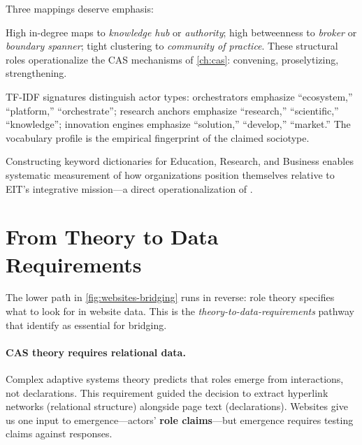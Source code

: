 \documentclass[../main.tex]{subfiles}
\begin{document}
Three mappings deserve emphasis:

\begin{description}[leftmargin=0.5cm, itemsep=0.3em]
\item[Network position $\rightarrow$ Structural role.]
High in-degree maps to \emph{knowledge hub} or \emph{authority};
high betweenness to \emph{broker} or \emph{boundary spanner};
tight clustering to \emph{community of practice}.
These structural roles operationalize the CAS mechanisms
of \cref{ch:cas}: convening, proselytizing, strengthening.

\item[Vocabulary profile $\rightarrow$ Claimed sociotype.]
TF-IDF signatures distinguish actor types:
orchestrators emphasize ``ecosystem,'' ``platform,'' ``orchestrate'';
research anchors emphasize ``research,'' ``scientific,'' ``knowledge'';
innovation engines emphasize ``solution,'' ``develop,'' ``market.''
The vocabulary profile is the empirical fingerprint of the claimed sociotype.

\item[Knowledge triangle balance $\rightarrow$ Positioning.]
Constructing keyword dictionaries for Education, Research, and Business
enables systematic measurement of how organizations position themselves
relative to EIT's integrative mission---a direct operationalization of
\textcite{maassen2011knowledge}.
\end{description}


\section{From Theory to Data Requirements}
\label{sec:websites-theory-data}

The lower path in \cref{fig:websites-bridging} runs in reverse:
role theory specifies what to look for in website data.
This is the \emph{theory-to-data-requirements} pathway that
\textcite{maass2018data} identify as essential for bridging.

\paragraph{CAS theory requires relational data.}
Complex adaptive systems theory predicts that roles emerge from
interactions, not declarations.
This requirement guided the decision to extract hyperlink networks
(relational structure) alongside page text (declarations).
Websites give us one input to emergence---actors' \textbf{role claims}---but
emergence requires testing claims against responses.
\end{document}
